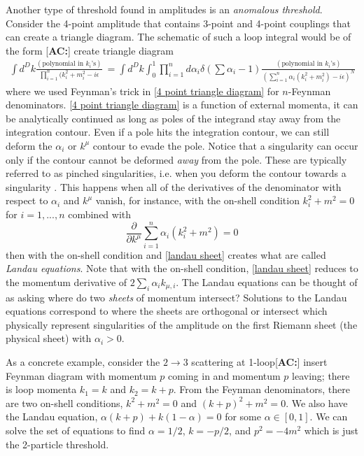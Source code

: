 \documentclass[a4paper,11pt]{article}
\newcommand{\ac}[1]{\textcolor{green3}{[\textbf{AC:}] #1}}
\begin{document}
Another type of threshold found in amplitudes is an \textit{anomalous threshold}. Consider the 4-point amplitude that contains 3-point and 4-point couplings that can create a triangle diagram. The schematic of such a loop integral would be of the form \cite{Eden:1966dnq} \ac{create triangle diagram}
\begin{align}
    \int d^Dk\frac{(\text{polynomial in $k_i$'s})}{\prod_{i=1}^n(k_i^2 + m_i^2 - i\epsilon} & = \int d^Dk\int_0^1\prod_{i=1}^n d\alpha_i\delta(\sum \alpha_i - 1)\frac{(\text{polynomial in $k_i$'s})}{\left(\sum_{i=1}^n\alpha_i(k_i^2 + m_i^2) - i\epsilon\right)^N}\label{4 point triangle diagram}
\end{align}
where we used Feynman's trick in \eqref{4 point triangle diagram} for $n$-Feynman denominators. \eqref{4 point triangle diagram} is a function of external momenta, it can be analytically continued as long as poles of the integrand stay away from the integration contour. Even if a pole hits the integration contour, we can still deform the $\alpha_i$ or $k^\mu$ contour to evade the pole. Notice that a singularity can occur only if the contour cannot be deformed \textit{away} from the pole. These are typically referred to as pinched singularities, i.e. when you deform the contour towards a singularity \cite{Mizera:2023tfe}. This happens when all of the derivatives of the denominator with respect to $\alpha_i$ and $k^\mu$ vanish, for instance, with the on-shell condition $k_i^2 + m^2 = 0$ for $i = 1,...,n$ combined with 
\begin{equation}
    \frac{\partial}{\partial k^\mu}\sum_{i=1}^n\alpha_i(k_i^2+m^2) = 0\label{landau sheet}
\end{equation}
then with the on-shell condition and \eqref{landau sheet} creates what are called \textit{Landau equations}. Note that with the on-shell condition, \eqref{landau sheet} reduces to the momentum derivative of $2\sum_i\alpha_i k_{\mu,i}$. The Landau equations can be thought of as asking where do two \textit{sheets} of momentum intersect? Solutions to the Landau equations correspond to where the sheets are orthogonal or intersect which physically represent singularities of the amplitude on the first Riemann sheet (the physical sheet) with $\alpha_i>0$. 

As a concrete example, consider the $2\rightarrow 3$ scattering at 1-loop\ac{insert Feynman diagram} with momentum $p$ coming in and momentum $p$ leaving; there is loop momenta $k_1 = k$ and $k_2 = k+p$. From the Feynman denominators, there are two on-shell conditions, $k^2 + m^2 = 0$ and $(k+p)^2 + m^2 = 0$. We also have the Landau equation, $\alpha(k+p) + k(1-\alpha) = 0$ for some $\alpha\in[0,1]$. We can solve the set of equations to find $\alpha = 1/2$, $k = -p/2$, and $p^2 = -4m^2$ which is just the 2-particle threshold. 
\end{document}
